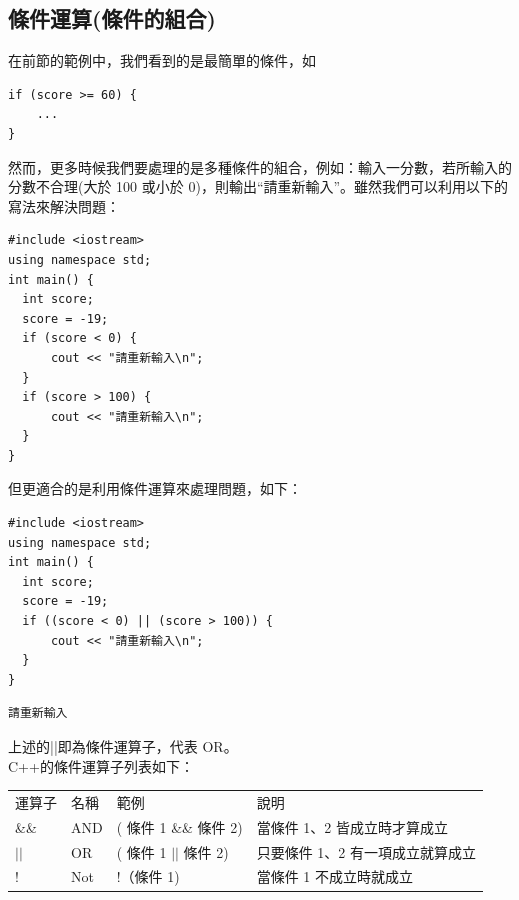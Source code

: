 \documentclass[a4paper,12pt]{article}
\begin{document}
\subsection{條件運算(條件的組合)}
\label{sec:org0846d26}
在前節的範例中，我們看到的是最簡單的條件，如\\
\lstset{breaklines=true,language=cpp,label= ,caption= ,captionpos=b,firstnumber=1,numbers=left}
\begin{lstlisting}
if (score >= 60) {
    ...
}
\end{lstlisting}
然而，更多時候我們要處理的是多種條件的組合，例如：輸入一分數，若所輸入的分數不合理(大於 100 或小於 0)，則輸出``請重新輸入''。雖然我們可以利用以下的寫法來解決問題：\\
\lstset{breaklines=true,language=cpp,label= ,caption= ,captionpos=b,firstnumber=1,numbers=left}
\begin{lstlisting}
#include <iostream>
using namespace std;
int main() {
  int score;
  score = -19;
  if (score < 0) {
      cout << "請重新輸入\n";
  }
  if (score > 100) {
      cout << "請重新輸入\n";
  }
}
\end{lstlisting}
但更適合的是利用條件運算來處理問題，如下：\\
\lstset{breaklines=true,language=cpp,label= ,caption= ,captionpos=b,firstnumber=1,numbers=left}
\begin{lstlisting}
#include <iostream>
using namespace std;
int main() {
  int score;
  score = -19;
  if ((score < 0) || (score > 100)) {
      cout << "請重新輸入\n";
  }
}
\end{lstlisting}

\begin{verbatim}
請重新輸入
\end{verbatim}


上述的||即為條件運算子，代表 OR。\\

C++的條件運算子列表如下：\\
\begin{center}
\begin{tabular}{llll}
運算子 & 名稱 & 範例 & 說明\\
\&\& & AND & ( 條件 1 \&\& 條件 2) & 當條件 1、2 皆成立時才算成立\\
\(\vert{} \vert{}\) & OR & ( 條件 1 \(\vert{} \vert{}\) 條件 2) & 只要條件 1、2 有一項成立就算成立\\
! & Not & !（條件 1) & 當條件 1 不成立時就成立\\
\end{tabular}
\end{center}
\end{document}
